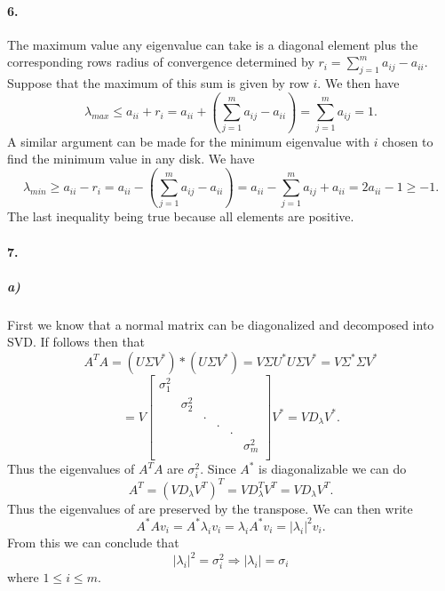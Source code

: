 \documentclass[12pt]{article}
\begin{document}
	
\paragraph{6.}
	The maximum value any eigenvalue can take is a diagonal element plus the corresponding rows radius of convergence determined by $r_i = \sum_{j=1}^{m} a_{ij} - a_{ii}$. Suppose that the maximum of this sum is given by row $i$. We then have
	\[
	\lambda_{max} \le a_{ii} + r_i = a_{ii} + \left( \sum_{j=1}^{m} a_{ij} - a_{ii} \right) = \sum_{j=1}^{m} a_{ij} = 1.
	\]
	A similar argument can be made for the minimum eigenvalue with $i$ chosen to find the minimum value in any disk. We have 
	\[
	\lambda_{min} \ge a_{ii} - r_i = a_{ii} - \left( \sum_{j=1}^{m} a_{ij} - a_{ii} \right)
	= a_{ii} - \sum_{j=1}^{m} a_{ij} + a_{ii} = 2a_{ii} - 1 \ge -1.
	\]
	The last inequality being true because all elements are positive.
	
\paragraph{7.}
	\subparagraph{a)}
		First we know that a normal matrix can be diagonalized and decomposed into SVD. If follows then that
		\[
		A^TA = (U\Sigma V^*)*(U\Sigma V^*) = V\Sigma U^*U\Sigma V^* = V\Sigma^*\Sigma V^*
		\]
		\[
		= V
		\begin{bmatrix}
		\sigma_1^2 & && & & \\
		& \sigma_2^2 & & \\
		& & . & & & \\
		& & & . & & \\
		& & & & . &\\
		& & & & & \sigma_m^2 \\
		\end{bmatrix}
		V^* = VD_{\lambda}V^*.
		\]
		Thus the eigenvalues of $A^TA$ are $\sigma_i^2$. Since $A^*$ is diagonalizable we can do
		\[
		A^T = (VD_{\lambda}V^T)^T = VD_{\lambda}^TV^T = VD_{\lambda}V^T.
		\]
		Thus the eigenvalues of are preserved by the transpose. We can then write 
		\[
		A^*Av_i = A^*\lambda_i v_i = \lambda_i A^* v_i = |\lambda_i|^2 v_i.
		\]
		From this we can conclude that 
		\[
		|\lambda_i|^2 = \sigma_i^2 \Rightarrow |\lambda_i| = \sigma_i 
		\]
		where $1 \le i \le m$.
	
\end{document}
